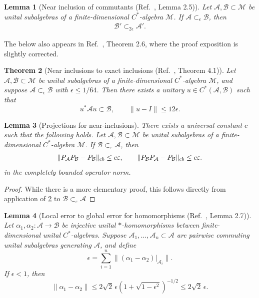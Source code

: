 \documentclass[11pt,reqno]{amsart}
\newtheorem{theorem}{Theorem}[section]
\newtheorem{lemma}[theorem]{Lemma}
\theoremstyle{definition}
\theoremstyle{remark}
\numberwithin{equation}{section}
\newcommand{\eps}{\varepsilon}
\newcommand{\cA}{\mathcal A}
\newcommand{\cB}{\mathcal B}
\newcommand{\cM}{\mathcal M}
\DeclarePairedDelimiter\norm{\lVert}{\rVert}
\begin{document}
\begin{lemma}[Near inclusion of commutants (Ref.~\cite{ranard2022converse}, Lemma 2.5)]\label{lemma:near-inclusion-commutants}
Let $\cA, \cB \subset \cM$ be unital subalgebras of a finite-dimensional $C^*$-algebra $\cM$. If $\cA \subset_\epsilon \cB$, then
\begin{align}
\cB' \subset_{2\epsilon} \cA'.
\end{align}
\end{lemma}

The below also appears in Ref.~\cite{ranard2022converse}, Theorem 2.6, where the proof exposition is slightly corrected.
\begin{theorem}[Near inclusions to exact inclusions (Ref.~\cite{christensen1980near}, Theorem 4.1)]\label{thm:near-inclusion-unitary}
Let $\mathcal{A},\mathcal{B} \subset \mathcal{M}$ be unital subalgebras of a finite-dimensional $C^*$-algebra $\mathcal{M}$, and suppose $\mathcal{A} \subset_\epsilon \mathcal{B}$ with $\epsilon \le 1/64$. Then there exists a unitary $u \in C^*(\mathcal{A},\mathcal{B})$ such that
\[
u^* \mathcal{A} u \subset \mathcal{B},
\qquad
\|u-I\| \le 12\epsilon.
\]
\end{theorem}


\begin{lemma}[Projections for near-inclusions] \label{lemma:PP-subalgebra}
There exists a universal constant $c$ such that the following holds. Let $\cA, \cB \subset \cM$ be unital subalgebras of a finite-dimensional $C^*$-algebra $\cM$.  If $\cB \subset_\eps \cA$, then
     \begin{align}
      \norm{P_{\cA} P_{\cB} - P_{\cB} }_{cb} \le c\eps , \qquad \norm{P_{\cB} P_{\cA} - P_{\cB}}_{cb}   \le c\eps.
 \end{align}
 in the completely bounded operator norm.
\end{lemma}
\begin{proof}
    While there is a more elementary proof, this follows directly from application of \cref{thm:near-inclusion-unitary} to  $\cB \subset_\eps \cA$
\end{proof}

\begin{lemma}[Local error to global error for homomorphisms (Ref.~\cite{ranard2022converse}, Lemma 2.7)]\label{lemma:local-to-global-hom}
Let $\alpha_1,\alpha_2 : \mathcal{A} \to \mathcal{B}$ be injective unital $*$-homomorphisms between finite-dimensional unital $C^*$-algebras. Suppose $\mathcal{A}_1,\ldots,\mathcal{A}_n \subset \mathcal{A}$ are pairwise commuting unital subalgebras generating $\mathcal{A}$, and define
\[
\epsilon = \sum_{i=1}^n \|(\alpha_1-\alpha_2)|_{\mathcal{A}_i}\|.
\]
If $\epsilon<1$, then
\[
\|\alpha_1-\alpha_2\|
\le
2\sqrt{2}\,\epsilon \left(1+\sqrt{1-\epsilon^2}\right)^{-1/2}
\le
2\sqrt{2}\,\epsilon.
\]
\end{lemma}
\end{document}
